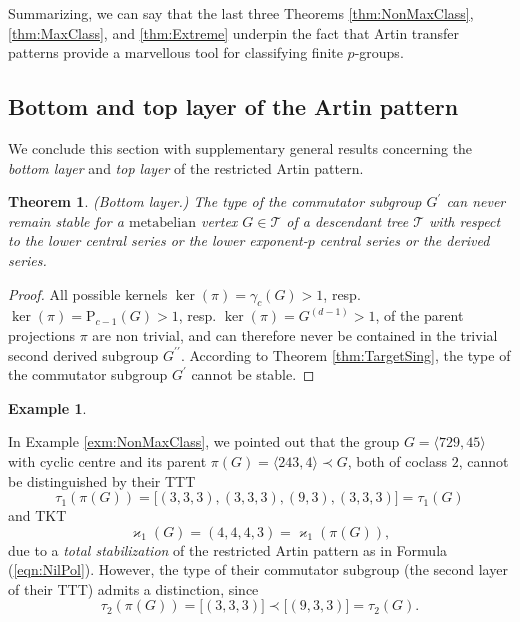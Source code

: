\documentclass{amsart}
\newtheorem{theorem}{Theorem}[section]
\theoremstyle{definition}
\newtheorem{example}{Example}[section]
\numberwithin{equation}{section}
\begin{document}
Summarizing, we can say that the last three Theorems
\ref{thm:NonMaxClass},
\ref{thm:MaxClass},
and
\ref{thm:Extreme}
underpin the fact that
Artin transfer patterns provide a marvellous tool for classifying finite \(p\)-groups.


\subsection{Bottom and top layer of the Artin pattern}
\label{ss:BottomTop}

We conclude this section with supplementary general results concerning
the \textit{bottom layer} and \textit{top layer} of the restricted Artin pattern.

\begin{theorem}
\label{thm:TypeCommLCAndDrvSer}
(Bottom layer.)
The type of the commutator subgroup \(G^\prime\)
can never remain stable for a \(\mathrm{metabelian}\) vertex \(G\in\mathcal{T}\)
of a descendant tree \(\mathcal{T}\) with respect to
the lower central series or the lower exponent-\(p\) central series or the derived series.
\end{theorem}

\begin{proof}
All possible kernels \(\ker(\pi)=\gamma_c(G)>1\),
resp. \(\ker(\pi)=\mathrm{P}_{c-1}(G)>1\),
resp. \(\ker(\pi)=G^{(d-1)}>1\),
of the parent projections \(\pi\) are non trivial,
and can therefore never be contained in the trivial second derived subgroup \(G^{\prime\prime}\).
According to Theorem
\ref{thm:TargetSing},
the type of the commutator subgroup \(G^\prime\) cannot be stable.
\end{proof}


\begin{example}
\label{exm:TypeComm}

In Example
\ref{exm:NonMaxClass},
we pointed out that the group \(G=\langle 729,45\rangle\) with cyclic centre
and its parent \(\pi(G)=\langle 243,4\rangle\prec G\), both of coclass \(2\),
cannot be distinguished by their TTT
\[\tau_1(\pi(G))=\lbrack (3,3,3),(3,3,3),(9,3),(3,3,3)\rbrack=\tau_1(G)\]
and TKT
\[\varkappa_1(G)=(4,4,4,3)=\varkappa_1(\pi(G)),\]
due to a \textit{total stabilization} of the restricted Artin pattern
as in Formula
(\ref{eqn:NilPol}).
However, the type of their commutator subgroup (the second layer of their TTT)
admits a distinction, since
\[\tau_2(\pi(G))=\lbrack (3,3,3)\rbrack\prec\lbrack (9,3,3)\rbrack=\tau_2(G).\]

\end{example}
\end{document}
